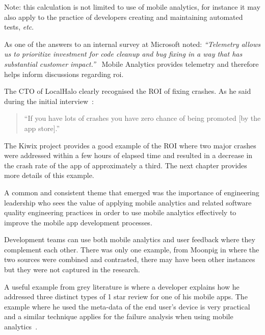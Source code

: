 \begin{kaobox}[frametitle=ROI in software development]
Note: this calculation is not limited to use of mobile analytics, for instance it may also apply to the practice of developers creating and maintaining automated tests, \textit{etc}.

As one of the answers to an internal survey at Microsoft noted: \emph{``Telemetry allows us to prioritize investment for code
cleanup and bug fixing in a way that has substantial
customer impact.''}~ Mobile Analytics provides telemetry and therefore helps inform discussions regarding \Gls{roi}. 
\end{kaobox}


The CTO of LocalHalo clearly recognised the ROI of fixing crashes. As he said during the initial interview~: 

\begin{quote}
    ``If you have lots of crashes you have zero chance of being promoted [by the app store].''
\end{quote}

The Kiwix project provides a good example of the ROI where two major crashes were addressed within a few hours of elapsed time and resulted in a decrease in the crash rate of the app of approximately a third. The next chapter provides more details of this example.

A common and consistent theme that emerged was the importance of engineering leadership who sees the value of applying mobile analytics and related software quality engineering practices in order to use mobile analytics effectively to improve the mobile app development processes. 

Development teams can use both mobile analytics and user feedback where they complement each other. There was only one example, from Moonpig in  where the two sources were combined and contrasted, there may have been other instances but they were not captured in the research. 

A useful example from grey literature is where a developer explains how he addressed three distinct types of 1 star review for one of his mobile apps. The example where he used the meta-data of the end user's device is very practical and a similar technique applies for the failure analysis when using mobile analytics~.

